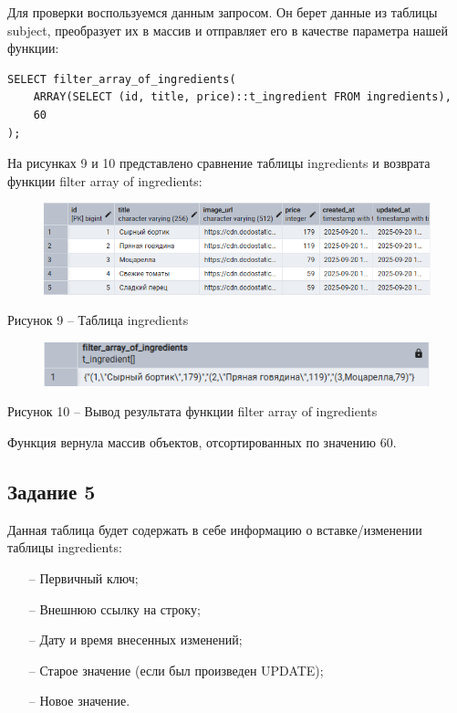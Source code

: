 \documentclass[a4paper,14pt]{extarticle}
\begin{document}
  Для проверки воспользуемся данным запросом. Он берет данные из таблицы subject, преобразует их в массив и отправляет его в качестве параметра нашей функции:

  \noindent
  \begin{Verbatim}[tabsize=4,fontsize=\small]
SELECT filter_array_of_ingredients(
    ARRAY(SELECT (id, title, price)::t_ingredient FROM ingredients),
    60
);
  \end{Verbatim}

  На рисунках 9 и 10 представлено сравнение таблицы ingredients и возврата функции filter array of ingredients:

  \begin{figure}[h]
    \centering
    \includegraphics[width=1\linewidth]{img/t-4-1}
  \end{figure}
  \begin{center}
    Рисунок 9 – Таблица ingredients
  \end{center}

  \begin{figure}[h]
    \centering
    \includegraphics[width=0.8\linewidth]{img/t-4-2}
  \end{figure}
  \begin{center}
    Рисунок 10 – Вывод результата функции filter array of ingredients
  \end{center}

  Функция вернула массив объектов, отсортированных по значению 60.

  \subsection*{Задание 5}
  Данная таблица будет содержать в себе информацию о вставке/изменении таблицы ingredients:

  \begin{itemize}
    \item[--] Первичный ключ;
    \item[--] Внешнюю ссылку на строку;
    \item[--] Дату и время внесенных изменений;
    \item[--] Старое значение (если был произведен UPDATE);
    \item[--] Новое значение.
  \end{itemize}
\end{document}
